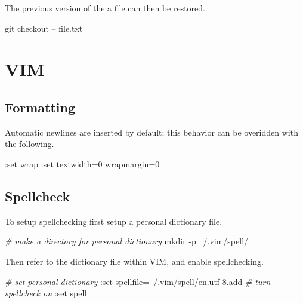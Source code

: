 \documentclass[]{book}
\newenvironment{Shaded}{\begin{snugshade}}{\end{snugshade}}
\newcommand{\CommentTok}[1]{\textcolor[rgb]{0.56,0.35,0.01}{\textit{#1}}}
\newcommand{\FunctionTok}[1]{\textcolor[rgb]{0.00,0.00,0.00}{#1}}
\newcommand{\ExtensionTok}[1]{#1}
\newcommand{\NormalTok}[1]{#1}
\begin{document}
The previous version of the a file can then be restored.

\begin{Shaded}
\begin{Highlighting}[]
\FunctionTok{git}\NormalTok{ checkout -- file.txt}
\end{Highlighting}
\end{Shaded}

\chapter{VIM}\label{vim}

\section{Formatting}\label{formatting}

Automatic newlines are inserted by default; this behavior can be
overidden with the following.

\begin{Shaded}
\begin{Highlighting}[]
\NormalTok{:}\ExtensionTok{set}\NormalTok{ wrap}
\NormalTok{:}\ExtensionTok{set}\NormalTok{ textwidth=0 wrapmargin=0}
\end{Highlighting}
\end{Shaded}

\section{Spellcheck}\label{spellcheck}

To setup spellchecking first setup a personal dictionary file.

\begin{Shaded}
\begin{Highlighting}[]
\CommentTok{# make a directory for personal dictionary}
\FunctionTok{mkdir}\NormalTok{ -p ~/.vim/spell/}
\end{Highlighting}
\end{Shaded}

Then refer to the dictionary file within VIM, and enable spellchecking.

\begin{Shaded}
\begin{Highlighting}[]
\CommentTok{# set personal dictionary}
\NormalTok{:}\ExtensionTok{set}\NormalTok{ spellfile=~/.vim/spell/en.utf-8.add}
\CommentTok{# turn spellcheck on}
\NormalTok{:}\ExtensionTok{set}\NormalTok{ spell}
\end{Highlighting}
\end{Shaded}
\end{document}

